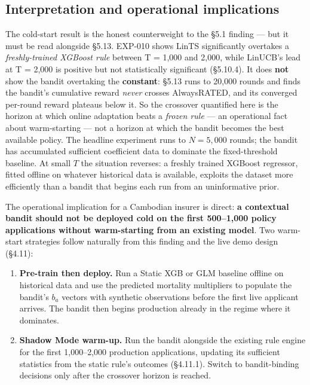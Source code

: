 \subsection{Interpretation and operational implications}\label{interpretation-and-operational-implications}

The cold-start result is the honest counterweight to the §5.1 finding --- but it must be read alongside §5.13. EXP-010 shows LinTS significantly overtakes a \emph{freshly-trained XGBoost rule} between T = 1,000 and 2,000, while LinUCB's lead at T = 2,000 is positive but not statistically significant (§5.10.4). It does \textbf{not} show the bandit overtaking the \textbf{constant}: §5.13 runs to 20,000 rounds and finds the bandit's cumulative reward \emph{never} crosses AlwaysRATED, and its converged per-round reward plateaus below it. So the crossover quantified here is the horizon at which online adaptation beats a \emph{frozen rule} --- an operational fact about warm-starting --- not a horizon at which the bandit becomes the best available policy. The headline experiment runs to \(N = 5{,}000\) rounds; the bandit has accumulated sufficient coefficient data to dominate the fixed-threshold baseline. At small \(T\) the situation reverses: a freshly trained XGBoost regressor, fitted offline on whatever historical data is available, exploits the dataset more efficiently than a bandit that begins each run from an uninformative prior.

The operational implication for a Cambodian insurer is direct: \textbf{a contextual bandit should not be deployed cold on the first 500--1,000 policy applications without warm-starting from an existing model}. Two warm-start strategies follow naturally from this finding and the live demo design (§4.11):

\begin{enumerate}
\def\labelenumi{\arabic{enumi}.}
\tightlist
\item
  \textbf{Pre-train then deploy.} Run a Static XGB or GLM baseline offline on historical data and use the predicted mortality multipliers to populate the bandit's \(b_a\) vectors with synthetic observations before the first live applicant arrives. The bandit then begins production already in the regime where it dominates.
\item
  \textbf{Shadow Mode warm-up.} Run the bandit alongside the existing rule engine for the first 1,000--2,000 production applications, updating its sufficient statistics from the static rule's outcomes (§4.11.1). Switch to bandit-binding decisions only after the crossover horizon is reached.
\end{enumerate}

